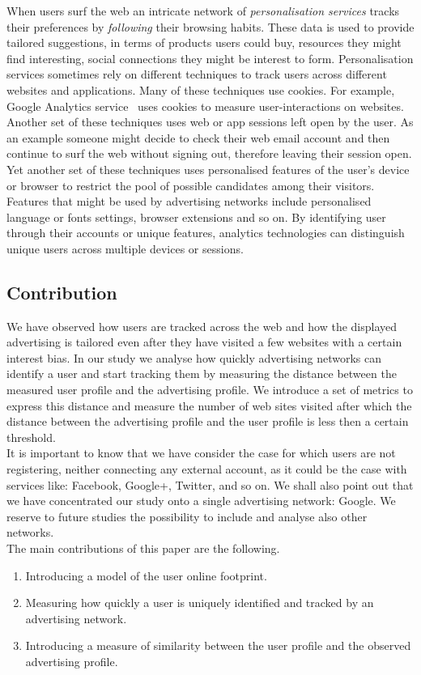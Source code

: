 \documentclass[runningheads,a4paper]{llncs}
\begin{document}
When users surf the web an intricate network of \emph{personalisation services} tracks their preferences by \emph{following} their browsing habits. These data is used to provide tailored suggestions, in terms of products users could buy, resources they might find interesting, social connections they might be interest to form.
Personalisation services sometimes rely on different techniques to track users across different websites and applications. Many of these techniques use cookies. For example, Google Analytics service~\cite{GoogleAnalytics} uses cookies to measure user-interactions on websites.  Another set of these techniques uses web or app sessions left open by the user. As an example someone might decide to check their web email account and then continue to surf the web without signing out, therefore leaving their session open. 
Yet another set of these techniques uses personalised features of the user's device or browser to restrict the pool of possible candidates among their visitors. Features that might be used by advertising networks include personalised language or fonts settings, browser extensions and so on.
By identifying user through their accounts or unique features, analytics technologies can distinguish unique users across multiple devices or sessions.

\subsection{Contribution}

We have observed how users are tracked across the web and how the displayed advertising is tailored even after they have visited a few websites with a certain interest bias. In our study we analyse how quickly advertising networks can identify a user and start tracking them by measuring the distance between the measured user profile and the advertising profile.
We introduce a set of metrics to express this distance and measure the number of web sites visited after which the distance between the advertising profile and the user profile is less then a certain threshold.
\\
It is important to know that we have consider the case for which users are not registering, neither connecting any external account, as it could be the case with services like: Facebook, Google+, Twitter, and so on.
We shall also point out that we have concentrated our study onto a single advertising network: Google. We reserve to future studies the possibility to include and analyse also other networks.
\\
\noindent
The main contributions of this paper are the following.
\begin{enumerate}
 \item  Introducing a model of the user online footprint.
 \item Measuring how quickly a user is uniquely identified and tracked by an advertising network.
 \item Introducing a measure of similarity between the user profile and the observed advertising profile.
 \end{enumerate}
\end{document}
